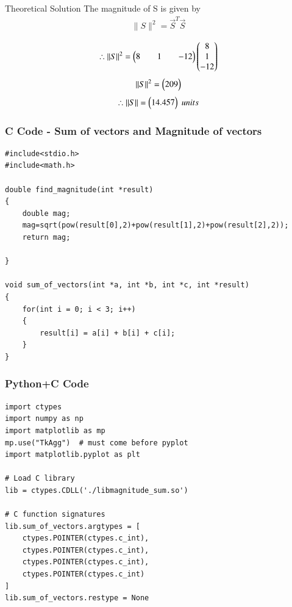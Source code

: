 \documentclass{beamer}
\begin{document}
\begin{frame}{Theoretical Solution}
The magnitude of S is given by \\
\begin{align}
    \|S\|^2=\vec{S}^T\vec{S}
\end{align}

\begin{align}
      \therefore\|S\|^2=\begin{myvec}{8&&1&&-12}\end{myvec}\begin{myvec}{8\\1\\-12}
      \end{myvec}
\end{align}
\begin{align}
    \|S\|^2=\begin{pmatrix}209\end{pmatrix}
\end{align}
\begin{align}
    \therefore\|S\|=\begin{pmatrix}14.457\end{pmatrix} \;units
\end{align}
\end{frame}

\begin{frame}[fragile]
    \frametitle{C Code - Sum of vectors and Magnitude of vectors}

    \begin{lstlisting}
#include<stdio.h>
#include<math.h>

double find_magnitude(int *result)
{
	double mag;
	mag=sqrt(pow(result[0],2)+pow(result[1],2)+pow(result[2],2));
	return mag;

}

void sum_of_vectors(int *a, int *b, int *c, int *result)
{
    for(int i = 0; i < 3; i++)
    {
        result[i] = a[i] + b[i] + c[i];
    }
}
    \end{lstlisting}
\end{frame}

\begin{frame}[fragile]
    \frametitle{Python+C Code}
    \begin{lstlisting}
import ctypes
import numpy as np
import matplotlib as mp
mp.use("TkAgg")  # must come before pyplot
import matplotlib.pyplot as plt

# Load C library
lib = ctypes.CDLL('./libmagnitude_sum.so')

# C function signatures
lib.sum_of_vectors.argtypes = [
    ctypes.POINTER(ctypes.c_int), 
    ctypes.POINTER(ctypes.c_int), 
    ctypes.POINTER(ctypes.c_int), 
    ctypes.POINTER(ctypes.c_int)
]
lib.sum_of_vectors.restype = None




    \end{lstlisting}
\end{frame}
\end{document}
